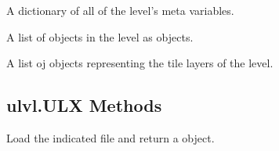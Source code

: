 \documentclass[letterpaper,10pt,english]{sphinxmanual}
\begin{document}
\begin{fulllineitems}
\begin{fulllineitems}
\label{\detokenize{index:ulvl.ULX.meta}}
A dictionary of all of the level's meta variables.

\end{fulllineitems}


\begin{fulllineitems}
\label{\detokenize{index:ulvl.ULX.objects}}
A list of objects in the level as {\hyperref[\detokenize{index:ulvl.LevelObject}]{}}
objects.

\end{fulllineitems}


\begin{fulllineitems}
\label{\detokenize{index:ulvl.ULX.layers}}
A list oj {\hyperref[\detokenize{index:ulvl.TileLayer}]{}} objects representing the tile layers
of the level.

\end{fulllineitems}


\end{fulllineitems}



\subsection{ulvl.ULX Methods}
\label{\detokenize{index:ulvl-ulx-methods}}

\begin{fulllineitems}
\label{\detokenize{index:ulvl.ULX.load}}
Load the indicated file and return a {\hyperref[\detokenize{index:ulvl.ULX}]{}} object.

\end{fulllineitems}

\end{document}
